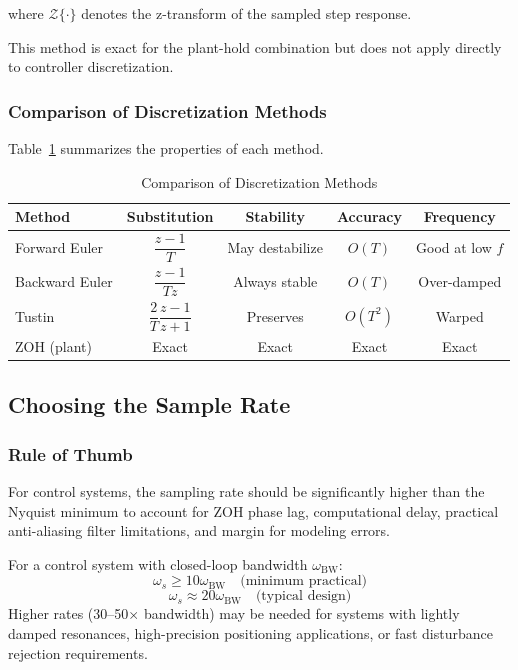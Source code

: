 where $\mathcal{Z}\{\cdot\}$ denotes the z-transform of the sampled step response.

This method is exact for the plant-hold combination but does not apply directly to controller discretization.

\subsubsection{Comparison of Discretization Methods}

Table~\ref{tab:discretization_comparison} summarizes the properties of each method.

\begin{table}[htbp]
\centering
\caption{Comparison of Discretization Methods}
\label{tab:discretization_comparison}
\begin{tabular}{lcccc}
\toprule
\textbf{Method} & \textbf{Substitution} & \textbf{Stability} & \textbf{Accuracy} & \textbf{Frequency} \\
\midrule
Forward Euler & $\dfrac{z-1}{T}$ & May destabilize & $O(T)$ & Good at low $f$ \\[1.5ex]
Backward Euler & $\dfrac{z-1}{Tz}$ & Always stable & $O(T)$ & Over-damped \\[1.5ex]
Tustin & $\dfrac{2}{T}\dfrac{z-1}{z+1}$ & Preserves & $O(T^2)$ & Warped \\[1.5ex]
ZOH (plant) & Exact & Exact & Exact & Exact \\
\bottomrule
\end{tabular}
\end{table}

\subsection{Choosing the Sample Rate}
\label{subsec:sample_rate_selection}

\subsubsection{Rule of Thumb}

For control systems, the sampling rate should be significantly higher than the Nyquist minimum to account for ZOH phase lag, computational delay, practical anti-aliasing filter limitations, and margin for modeling errors.

\begin{tcolorbox}[colback=yellow!10!white,colframe=orange!75!black,sharp corners,title=Sample Rate Guidelines]
For a control system with closed-loop bandwidth $\omega_{\text{BW}}$:
\begin{equation}
\omega_s \geq 10\omega_{\text{BW}} \quad \text{(minimum practical)}
\label{eq:sample_rate_min}
\end{equation}
\begin{equation}
\omega_s \approx 20\omega_{\text{BW}} \quad \text{(typical design)}
\label{eq:sample_rate_typical}
\end{equation}
Higher rates (30--50$\times$ bandwidth) may be needed for systems with lightly damped resonances, high-precision positioning applications, or fast disturbance rejection requirements.
\end{tcolorbox}

